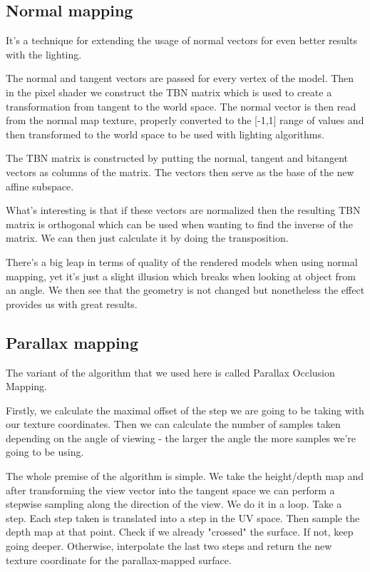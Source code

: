 \documentclass[12pt, english]{article}
\begin{document}
\subsection{Normal mapping}
It's a technique for extending the usage of normal vectors for even better results with the lighting.

The normal and tangent vectors are passed for every vertex of the model. Then in the pixel shader we construct the TBN matrix which is used to create a transformation from tangent to the world space. The normal vector is then read from the normal map texture, properly converted to the [-1,1] range of values and then transformed to the world space to be used with lighting algorithms.

The TBN matrix is constructed by putting the normal, tangent and bitangent vectors as columns of the matrix. The vectors then serve as the base of the new affine subspace.

What's interesting is that if these vectors are normalized then the resulting TBN matrix is orthogonal which can be used when wanting to find the inverse of the matrix. We can then just calculate it by doing the transposition.

There's a big leap in terms of quality of the rendered models when using normal mapping, yet it's just a slight illusion which breaks when looking at object from an angle. We then see that the geometry is not changed but nonetheless the effect provides us with great results.

\subsection{Parallax mapping}
The variant of the algorithm that we used here is called Parallax Occlusion Mapping.

Firstly, we calculate the maximal offset of the step we are going to be taking with our texture coordinates. Then we can calculate the number of samples taken depending on the angle of viewing - the larger the angle the more samples we're going to be using.

The whole premise of the algorithm is simple. We take the height/depth map and after transforming the view vector into the tangent space we can perform a stepwise sampling along the direction of the view. We do it in a loop. Take a step. Each step taken is translated into a step in the UV space. Then sample the depth map at that point. Check if we already "crossed" the surface. If not, keep going deeper. Otherwise, interpolate the last two steps and return the new texture coordinate for the parallax-mapped surface.
\end{document}

